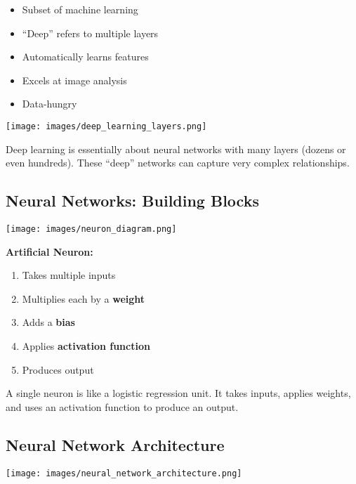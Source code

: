 \documentclass[
  letterpaper,
  DIV=11,
  numbers=noendperiod]{scrartcl}
\providecommand{\tightlist}{%
  \setlength{\itemsep}{0pt}\setlength{\parskip}{0pt}}
\begin{document}
\begin{itemize}
\tightlist
\item
  Subset of machine learning
\item
  ``Deep'' refers to multiple layers
\item
  Automatically learns features
\item
  Excels at image analysis
\item
  Data-hungry
\end{itemize}

\texttt{[image: images/deep\_learning\_layers.png]}

Deep learning is essentially about neural networks with many layers
(dozens or even hundreds). These ``deep'' networks can capture very
complex relationships.

\subsection{Neural Networks: Building
Blocks}\label{neural-networks-building-blocks}

\begin{center}
\texttt{[image: images/neuron\_diagram.png]}
\end{center}

\textbf{Artificial Neuron:}

\begin{enumerate}
\def\labelenumi{\arabic{enumi}.}
\tightlist
\item
  Takes multiple inputs
\item
  Multiplies each by a \textbf{weight}
\item
  Adds a \textbf{bias}
\item
  Applies \textbf{activation function}
\item
  Produces output
\end{enumerate}

A single neuron is like a logistic regression unit. It takes inputs,
applies weights, and uses an activation function to produce an output.

\subsection{Neural Network
Architecture}\label{neural-network-architecture}

\begin{center}
\texttt{[image: images/neural\_network\_architecture.png]}
\end{center}
\end{document}
